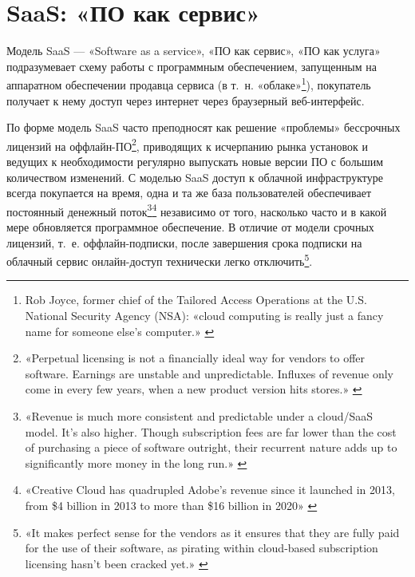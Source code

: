 \documentclass{article}
\begin{document}
\section*{SaaS: «ПО как сервис»}

Модель SaaS — «Software as a service», «ПО как сервис», «ПО как услуга» подразумевает схему работы с программным обеспечением, запущенным на аппаратном обеспечении продавца сервиса (в т.~н. «облаке»\footnote{Rob Joyce, former chief of the Tailored Access Operations at the U.S. National Security Agency (NSA): «cloud computing is really just a fancy name for someone else’s computer.» \cite{cloudIsAFancyName}}), покупатель получает к нему доступ через интернет через браузерный веб-интерфейс.

По форме модель SaaS часто преподносят как решение «проблемы» бессрочных лицензий на оффлайн-ПО\footnote{«Perpetual licensing is not a financially ideal way for vendors to offer software. Earnings are unstable and unpredictable. Influxes of revenue only come in every few years, when a new product version hits stores.» \cite{saasVsPerpetualLicense}}, приводящих к исчерпанию рынка установок и ведущих к необходимости регулярно выпускать новые версии ПО с большим количеством изменений. С моделью SaaS доступ к облачной инфраструктуре всегда покупается на время, одна и та же база пользователей обеспечивает постоянный денежный поток\footnote{«Revenue is much more consistent and predictable under a cloud/SaaS model. It’s also higher. Though subscription fees are far lower than the cost of purchasing a piece of software outright, their recurrent nature adds up to significantly more money in the long run.» \cite{saasVsPerpetualLicense}}\footnote{«Creative Cloud has quadrupled Adobe's revenue since it launched in 2013, from \$4 billion in 2013 to more than \$16 billion in 2020» \cite{subscriptionProspere}} независимо от того, насколько часто и в какой мере обновляется программное обеспечение. В отличие от модели срочных лицензий, т.~е. оффлайн-подписки, после завершения срока подписки на облачный сервис онлайн-доступ технически легко отключить\footnote{«It makes perfect sense for the vendors as it ensures that they are fully paid for the use of their software, as pirating within cloud-based subscription licensing hasn’t been cracked yet.» \cite{microsoftMoveToSubscriptionAndSaas}}.
\end{document}
